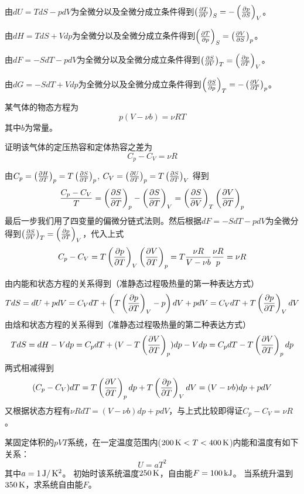 \documentclass[CJK]{beamer}
\begin{document}
\begin{frame}
  \bch
\bitem
\item{由$dU = TdS - pdV$为全微分以及全微分成立条件得到$\pfrac TVS = -\pfrac pSV$。}
\item{由$dH = TdS + Vdp$为全微分以及全微分成立条件得到$\pfrac TpS = \pfrac VSp$。}
\item{由$dF = -SdT - pdV$为全微分以及全微分成立条件得到$\pfrac SVT = \pfrac pTV$。}
\item{由$dG = -SdT + Vdp$为全微分以及全微分成立条件得到$\pfrac SpT = -\pfrac VTp$。}
\eitem
  \ech
\end{frame}

\begin{frame}
  \bch
某气体的物态方程为
$$p(V-\nu b) = \nu R T$$
其中$b$为常量。

证明该气体的定压热容和定体热容之差为
$$ C_p - C_V = \nu R $$

  \ech
\end{frame}

\begin{frame}
  \bch
由$C_p  =\pfrac HTp = T \pfrac STp$, $C_V = \pfrac UTp = T\pfrac STV$
得到
$$\frac{C_p - C_V}{T} = \pfrac STp - \pfrac STV = \pfrac SVT  \pfrac VTp $$
最后一步我们用了四变量的偏微分链式法则。然后根据$dF = - SdT - pdV$为全微分得到$\pfrac SVT = \pfrac pTV$，代入上式
$$ C_p - C_V = T\pfrac pTV \pfrac VTp = T \frac{\nu R}{V-\nu b} \frac{\nu R}{p} = \nu R$$

  \ech
\end{frame}


\begin{frame}
  \bch
由内能和状态方程的关系得到（准静态过程吸热量的第一种表达方式）
{\scriptsize 
$$ T dS  = dU + pdV = C_V dT + \left(T\pfrac pTV -p\right)dV+pdV = C_V dT + T\pfrac pTV dV  $$}
由焓和状态方程的关系得到（准静态过程吸热量的第二种表达方式）
{\scriptsize 
$$ TdS = dH - Vdp = C_p dT + (V-T\pfrac VTp)dp - Vdp = C_p dT - T\pfrac VTp dp$$}
两式相减得到
$$ (C_p- C_V)dT =  T\pfrac VTp dp + T\pfrac pTV dV = (V-\nu b)dp + p dV $$
又根据状态方程有$ \nu R dT = (V-\nu b) dp + p dV$，与上式比较即得证$C_p - C_V = \nu R$。
  \ech
\end{frame}


\begin{frame}
  \bch
某固定体积的$pVT$系统，在一定温度范围内($200\SIK < T< 400 \SIK$)内能和温度有如下关系：
  $$U =  aT^2 $$
  其中$a=1 \SIJ/\SIK^2$。
  初始时该系统温度$250\SIK$，自由能$F = 100 \SIkJ$。
  当系统升温到$350\SIK$，求系统自由能$F$。
  \ech
\end{frame}
\end{document}
